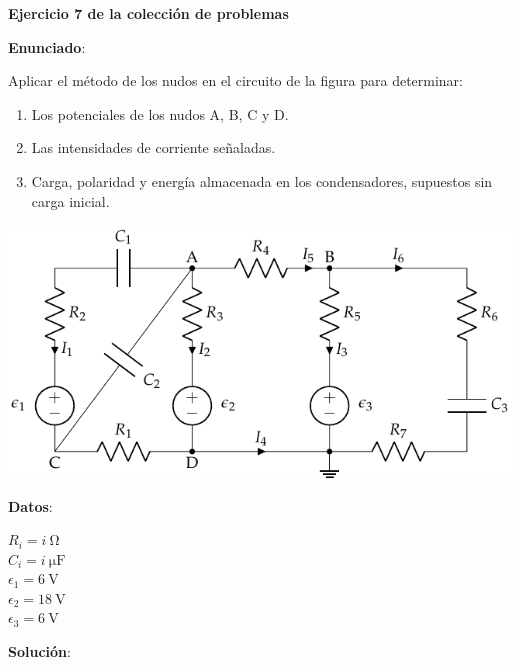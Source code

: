 \documentclass[10pt]{article}
\begin{document}
\large{\textbf{Ejercicio 7 de la colección de problemas}}

\vspace{3mm}
\large{\textbf{Enunciado}}:

\vspace{3mm}
Aplicar el método de los nudos en el circuito de la figura para
determinar:

\begin{enumerate}
    \item Los potenciales de los nudos A, B, C y D.
    \item Las intensidades de corriente señaladas.
    \item Carga, polaridad y energía almacenada en los condensadores, supuestos sin carga inicial.
\end{enumerate}

\begin{minipage}{0.85\linewidth}
  \includegraphics[scale=1.2]{figs/nudos_condensadores.pdf}
\end{minipage}
\begin{minipage}{0.25\linewidth}
    \textbf{Datos}:
    \vspace{2mm}
    
    $R_i = \qty[parse-numbers=false]{i}{\ohm}$\\
    $C_i = \qty[parse-numbers=false]{i}{\micro\farad}$\\
    $\epsilon_1=\qty{6}{\volt}$\\
    $\epsilon_2 = \qty{18}{\volt}$\\
    $\epsilon_3 = \qty{6}{\volt}$    
\end{minipage}

\vspace{7mm}

\hrulefill

\vspace{8mm}
\textbf{Solución}:
\vspace{4mm}
\end{document}
